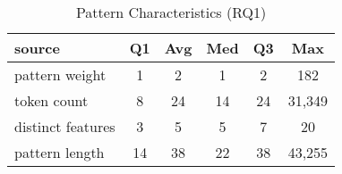 \begin{table}[tb]
\begin{center}
\caption{Pattern Characteristics (RQ1)}
\label{table:patternStats}

\begin{tabular}{l|ccccc}
\toprule
source & Q1 & Avg & Med & Q3 & Max \\ 
\midrule
pattern weight & 1 & 2 & 1 & 2 & 182 \\ 
\midrule
token count & 8 & 24 & 14 & 24 & 31,349 \\ 
\midrule
distinct features & 3 & 5 & 5 & 7 & 20 \\ 
\midrule
pattern length & 14 & 38 & 22 & 38 & 43,255 \\ 
\bottomrule
\end{tabular}
\end{center}
\end{table}
